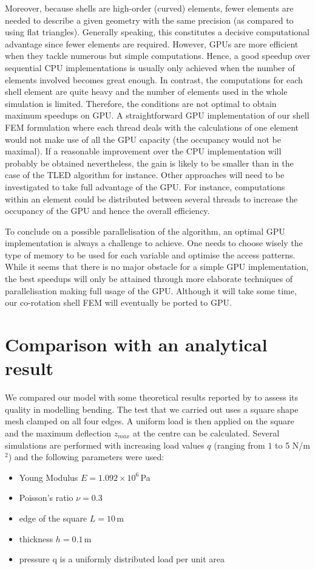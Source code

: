 Moreover, because shells are high-order (curved) elements, fewer elements are needed to describe a given geometry with the same precision (as compared to using flat triangles). Generally speaking, this constitutes a decisive computational advantage since fewer elements are required. However, GPUs are more efficient when they tackle numerous but simple computations. Hence, a good speedup over sequential CPU implementations is usually only achieved when the number of elements involved becomes great enough. In contrast, the computations for each shell element are quite heavy and the number of elements used in the whole simulation is limited. Therefore, the conditions are not optimal to obtain maximum speedups on GPU. A straightforward GPU implementation of our shell FEM formulation where each thread deals with the calculations of one element would not make use of all the GPU capacity (the occupancy would not be maximal). If a reasonable improvement over the CPU implementation will probably be obtained nevertheless, the gain is likely to be smaller than in the case of the TLED algorithm for instance. Other approaches will need to be investigated to take full advantage of the GPU. For instance, computations within an element could be distributed between several threads to increase the occupancy of the GPU and hence the overall efficiency. 

To conclude on a possible parallelisation of the algorithm, an optimal GPU implementation is always a challenge to achieve. One needs to choose wisely the type of memory to be used for each variable and optimise the access patterns. While it seems that there is no major obstacle for a simple GPU implementation, the best speedups will only be attained through more elaborate techniques of parallelisation making full usage of the GPU. Although it will take some time, our co-rotation shell FEM will eventually be ported to GPU. 


\section{Comparison with an analytical result}

We compared our model with some theoretical results reported by \cite{Zhongnian86} to assess its quality in modelling bending. The test that we carried out uses a square shape mesh clamped on all four edges. A uniform load is then applied on the square and the maximum deflection $z_{max}$ at the centre can be calculated. Several simulations are performed with increasing load values $q$ (ranging from $1$ to 5 N/m$^2$) and the following parameters were used: 
\begin{itemize}
 \item Young Modulus $E = 1.092 \times 10^6\,$Pa
 \item Poisson's ratio $\nu = 0.3$
 \item edge of the square $L = 10\,$m
 \item thickness $h = 0.1\,$m
 \item pressure q is a uniformly distributed load per unit area
\end{itemize}


